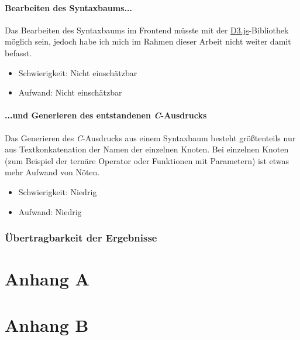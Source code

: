 \documentclass[oneside]{ausarbeitung}
\begin{document}
\subsubsection{Bearbeiten des Syntaxbaums...}
Das Bearbeiten des Syntaxbaums im Frontend müsste mit der \href{https://d3js.org}{D3.js}-Bibliothek möglich sein, jedoch habe ich mich im Rahmen dieser Arbeit nicht weiter damit befasst.
\begin{itemize}
\item{Schwierigkeit: Nicht einschätzbar}
\item{Aufwand: Nicht einschätzbar}
\end{itemize}
\subsubsection{...und Generieren des entstandenen \textit{C}-Ausdrucks}
Das Generieren des \textit{C}-Ausdrucks aus einem Syntaxbaum besteht größtenteils nur aus Textkonkatenation der Namen der einzelnen Knoten. Bei einzelnen Knoten (zum Beispiel der ternäre Operator oder Funktionen mit Parametern) ist etwas mehr Aufwand von Nöten.
\begin{itemize}
\item{Schwierigkeit: Niedrig}
\item{Aufwand: Niedrig}
\end{itemize}

\subsection{Übertragbarkeit der Ergebnisse}
\label{sub:uebertragbarkeit}

\appendix

\printbibliography

\chapter{Anhang A}

\chapter{Anhang B}
\end{document}
